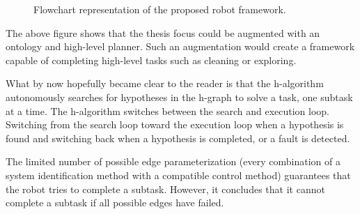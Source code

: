\begin{figure}[H]
\caption{Flowchart representation of the proposed robot framework.}%
\label{tikz:flowchart_proposed_method}
\end{figure}

The above figure shows that the thesis focus could be augmented with an ontology and high-level planner. Such an augmentation would create a framework capable of completing high-level tasks such as cleaning or exploring.\bs





What by now hopefully became clear to the reader is that the \ac{h-algorithm} autonomously searches for hypotheses in the \ac{h-graph} to solve a task, one subtask at a time. The \ac{h-algorithm} switches between the search and execution loop. Switching from the search loop toward the execution loop when a hypothesis is found and switching back when a hypothesis is completed, or a fault is detected.\bs

The limited number of possible edge parameterization (every combination of a system identification method with a compatible control method) guarantees that the robot tries to complete a subtask. However, it concludes that it cannot complete a subtask if all possible edges have failed.\bs


